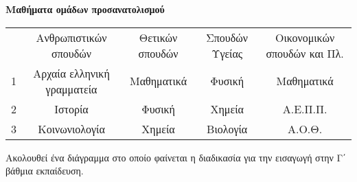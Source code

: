 \documentclass[twoside,nofonts,internet,math,spyros]{Aithsh-gnwsh}
\begin{document}
\setlength\arrayrulewidth{1pt}
\begin{center}
{\large \textbf{Μαθήματα ομάδων προσανατολισμού}}\mbox{}\\\vspace{3mm}
\begin{tabular}{l|c|c|c|c}
\rowcolor{cyan!50!gray}\rule[-2ex]{0pt}{5ex}  & Ανθρωπιστικών σπουδών      & Θετικών σπουδών & Σπουδών Υγείας & Οικονομικών σπουδών και Πλ. \\ 
\hhline{=====}\rowcolor[HTML]{ECF4FF}\rule[-2ex]{0pt}{5ex}
1 & Αρχαία ελληνική γραμματεία & Μαθηματικά      & Φυσική         & Μαθηματικά                           \\
\rule[-2ex]{0pt}{5ex} 2 & Ιστορία                    & Φυσική          & Χημεία         & Α.Ε.Π.Π.                             \\
\rowcolor[HTML]{ECF4FF}\rule[-2ex]{0pt}{5ex} 3 & Κοινωνιολογία              & Χημεία          & Βιολογία       & Α.Ο.Θ.                              
\end{tabular}
\end{center}
\vspace{0.5cm}
Ακολουθεί ένα διάγραμμα στο οποίο φαίνεται η διαδικασία για την εισαγωγή στην Γ΄ βάθμια εκπαίδευση.
\vspace{.5cm}
\end{document}
